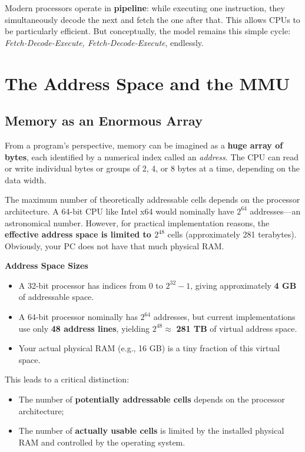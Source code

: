 Modern processors operate in \textbf{pipeline}: while executing one instruction, they simultaneously decode the next and fetch the one after that. This allows CPUs to be particularly efficient. But conceptually, the model remains this simple cycle: \emph{Fetch-Decode-Execute, Fetch-Decode-Execute}, endlessly.

\section{The Address Space and the MMU}

\subsection{Memory as an Enormous Array}

From a program's perspective, memory can be imagined as a \textbf{huge array of bytes}, each identified by a numerical index called an \emph{address}. The CPU can read or write individual bytes or groups of 2, 4, or 8 bytes at a time, depending on the data width.

The maximum number of theoretically addressable cells depends on the processor architecture. A 64-bit CPU like Intel x64 would nominally have $2^{64}$ addresses---an astronomical number. However, for practical implementation reasons, the \textbf{effective address space is limited to $2^{48}$} cells (approximately 281 terabytes). Obviously, your PC does not have that much physical RAM.

\begin{memoryblock}
\textbf{Address Space Sizes} \\
\begin{itemize}
    \item A 32-bit processor has indices from $0$ to $2^{32}-1$, giving approximately \textbf{4 GB} of addressable space.
    \item A 64-bit processor nominally has $2^{64}$ addresses, but current implementations use only \textbf{48 address lines}, yielding $2^{48} \approx$ \textbf{281 TB} of virtual address space.
    \item Your actual physical RAM (e.g., 16 GB) is a tiny fraction of this virtual space.
\end{itemize}
\end{memoryblock}

This leads to a critical distinction:
\begin{itemize}
    \item The number of \textbf{potentially addressable cells} depends on the processor architecture;
    \item The number of \textbf{actually usable cells} is limited by the installed physical RAM and controlled by the operating system.
\end{itemize}

